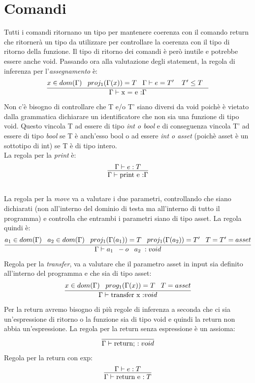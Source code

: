 \documentclass[12pt, a4paper]{report}
\begin{document}
\section{Comandi}
Tutti i comandi ritornano un tipo per mantenere coerenza con il comando return che ritornerà un tipo da utilizzare per controllare la coerenza con il tipo di ritorno della funzione. Il tipo di ritorno dei comandi è però inutile e potrebbe essere anche void.
Passando ora alla valutazione degli statement, la regola di inferenza per l'\emph{assegnamento} è: \\
\[\infer{\Gamma \vdash \mbox{x = e :} \Gamma}{x \in dom(\Gamma) \;\;\; proj_1(\Gamma(x))=T \;\;\; \Gamma \vdash e= T' \;\;\;\; T'\leq T \;\;\; }\]
Non c'è bisogno di controllare che T e/o T' siano diversi da void poichè è vietato dalla grammatica dichiarare un identificatore che non sia una funzione di tipo void. Questo vincola T ad essere di tipo \emph{int o bool} e di conseguenza vincola T' ad essere di tipo \emph{bool} se T è anch'esso bool o ad essere \emph{int o asset} (poichè asset è un sottotipo di int) se T è di tipo intero. \\
La regola per la \emph{print} è:
\[\infer{\Gamma \vdash \mbox{print e :} \Gamma}{\Gamma \vdash e: T}\]\\
La regola per la \emph{move} va a valutare i due parametri, controllando che siano dichiarati (non all'interno del dominio di testa ma all'interno di tutto il programma) e controlla che entrambi i parametri siano di tipo asset. La regola quindi è:\\
\[
\infer{\Gamma \vdash a_1\;\; -o\;\;\; a_2\; : void}{a_1 \in dom(\Gamma) \;\;\; a_2 \in dom(\Gamma) \;\;\;proj_1(\Gamma(a_1)) = T \;\;\; proj_1(\Gamma(a_2)) = T' \;\;\; T=T'=asset}
    \]
Regola per la \emph{transfer}, va a valutare che il parametro asset in input sia definito all'interno del programma e che sia di tipo asset:\\
\[\infer{\Gamma \vdash \mbox{transfer x :} void}{x \in dom(\Gamma) \;\;\; prog_1(\Gamma(x))=T \;\;\; T=asset}\]
Per la return avremo bisogno di più regole di inferenza a seconda che ci sia un'espressione di ritorno o la funzione sia di tipo void e quindi la return non abbia un'espressione.
La regola per la return senza espressione è un assioma:\\
\[\infer{\Gamma \vdash \mbox{return; :\;} void}{}\]
Regola per la return con exp:\\
\[\infer{\Gamma \vdash \mbox{return e :\;} T}{\Gamma \vdash e: T}\]
\end{document}
